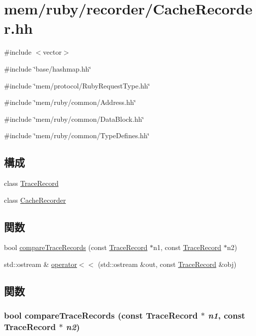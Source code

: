 \hypertarget{CacheRecorder_8hh}{
\section{mem/ruby/recorder/CacheRecorder.hh}
\label{CacheRecorder_8hh}
}
{\ttfamily \#include $<$vector$>$}\par
{\ttfamily \#include \char`\"{}base/hashmap.hh\char`\"{}}\par
{\ttfamily \#include \char`\"{}mem/protocol/RubyRequestType.hh\char`\"{}}\par
{\ttfamily \#include \char`\"{}mem/ruby/common/Address.hh\char`\"{}}\par
{\ttfamily \#include \char`\"{}mem/ruby/common/DataBlock.hh\char`\"{}}\par
{\ttfamily \#include \char`\"{}mem/ruby/common/TypeDefines.hh\char`\"{}}\par
\subsection*{構成}
\begin{DoxyCompactItemize}
\item 
class \hyperlink{classTraceRecord}{TraceRecord}
\item 
class \hyperlink{classCacheRecorder}{CacheRecorder}
\end{DoxyCompactItemize}
\subsection*{関数}
\begin{DoxyCompactItemize}
\item 
bool \hyperlink{CacheRecorder_8hh_aa4ec0717026f10a2fef0d56a3e765703}{compareTraceRecords} (const \hyperlink{classTraceRecord}{TraceRecord} $\ast$n1, const \hyperlink{classTraceRecord}{TraceRecord} $\ast$n2)
\item 
std::ostream \& \hyperlink{CacheRecorder_8hh_a2a1c0256ae48f49b411edc0208af933b}{operator$<$$<$} (std::ostream \&out, const \hyperlink{classTraceRecord}{TraceRecord} \&obj)
\end{DoxyCompactItemize}


\subsection{関数}
\hypertarget{CacheRecorder_8hh_aa4ec0717026f10a2fef0d56a3e765703}{
\subsubsection[{compareTraceRecords}]{\setlength{\rightskip}{0pt plus 5cm}bool compareTraceRecords (const {\bf TraceRecord} $\ast$ {\em n1}, \/  const {\bf TraceRecord} $\ast$ {\em n2})}}
\label{CacheRecorder_8hh_aa4ec0717026f10a2fef0d56a3e765703}



